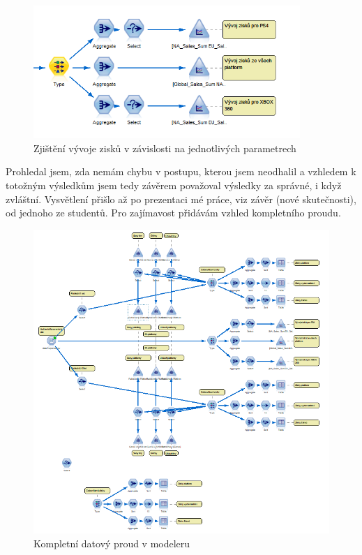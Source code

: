 \documentclass[FM,ZP]{tulthesis}
\begin{document}
\begin{figure}[H]
\begin{center}
\includegraphics[width=0.9\textwidth]{images/alloverSales.png}
\caption{Zjištění vývoje zisků v závislosti na jednotlivých parametrech}
\label{image}
\end{center}
\end{figure}

Prohledal jsem, zda nemám chybu v postupu, kterou jsem neodhalil a vzhledem k totožným výsledkům jsem tedy závěrem považoval výsledky za správné, i když zvláštní. Vysvětlení přišlo až po prezentaci mé práce, viz závěr (nové skutečnosti), od jednoho ze studentů. Pro zajímavost přidávám vzhled kompletního proudu.

\begin{figure}[H]
\begin{center}
\includegraphics[width=\textwidth]{images/all.png}
\caption{Kompletní datový proud v modeleru}
\label{image}
\end{center}
\end{figure}
\end{document}
